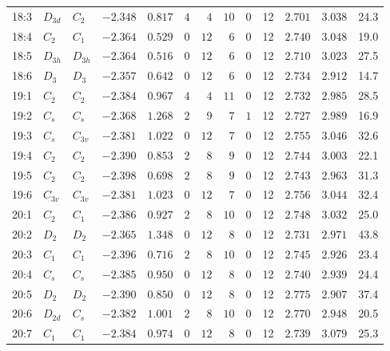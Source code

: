\begin{table}[ht!]
\begin{tabular}{lllrrrrrrrrrr}
18:3    & $D_{3d}$ & $C_{2 }$  & $-2.348$ & $0.817$  & $4$ & $4$  & $10$ & $0$ & 12 & $2.701$ & $3.038$  &  24.3 \\
18:4    & $C_2$    & $C_{1 }$  & $-2.364$ & $0.529$  & $0$ & $12$ & $6$  & $0$ & 12 & $2.740$ & $3.048$  &  19.0 \\
18:5    & $D_{3h}$ & $D_{3h}$  & $-2.364$ & $0.516$  & $0$ & $12$ & $6$  & $0$ & 12 & $2.710$ & $3.023$  &  27.5 \\
18:6    & $D_3$    & $D_{3 }$  & $-2.357$ & $0.642$  & $0$ & $12$ & $6$  & $0$ & 12 & $2.734$ & $2.912$  &  14.7 \\
19:1    & $C_2$    & $C_{2 }$  & $-2.384$ & $0.967$  & $4$ & $4$  & $11$ & $0$ & 12 & $2.732$ & $2.985$  &  28.5 \\
19:2    & $C_s$    & $C_{s }$  & $-2.368$ & $1.268$  & $2$ & $9$  & $7$  & $1$ & 12 & $2.727$ & $2.989$  &  16.9 \\
19:3    & $C_s$    & $C_{3v}$  & $-2.381$ & $1.022$  & $0$ & $12$ & $7$  & $0$ & 12 & $2.755$ & $3.046$  &  32.6 \\
19:4    & $C_2$    & $C_{2 }$  & $-2.390$ & $0.853$  & $2$ & $8$  & $9$  & $0$ & 12 & $2.744$ & $3.003$  &  22.1 \\
19:5    & $C_2$    & $C_{2 }$  & $-2.398$ & $0.698$  & $2$ & $8$  & $9$  & $0$ & 12 & $2.743$ & $2.963$  &  31.3 \\
19:6    & $C_{3v}$ & $C_{3v}$  & $-2.381$ & $1.023$  & $0$ & $12$ & $7$  & $0$ & 12 & $2.756$ & $3.044$  &  32.4 \\
20:1    & $C_2$    & $C_{1 }$  & $-2.386$ & $0.927$  & $2$ & $8$  & $10$ & $0$ & 12 & $2.748$ & $3.032$  &  25.0 \\
20:2    & $D_2$    & $D_{2 }$  & $-2.365$ & $1.348$  & $0$ & $12$ & $8$  & $0$ & 12 & $2.731$ & $2.971$  &  43.8 \\
20:3    & $C_1$    & $C_{1 }$  & $-2.396$ & $0.716$  & $2$ & $8$  & $10$ & $0$ & 12 & $2.745$ & $2.926$  &  23.4 \\
20:4    & $C_s$    & $C_{s }$  & $-2.385$ & $0.950$  & $0$ & $12$ & $8$  & $0$ & 12 & $2.740$ & $2.939$  &  24.4 \\
20:5    & $D_2$    & $D_{2 }$  & $-2.390$ & $0.850$  & $0$ & $12$ & $8$  & $0$ & 12 & $2.775$ & $2.907$  &  37.4 \\
20:6    & $D_{2d}$ & $C_{s }$  & $-2.382$ & $1.001$  & $2$ & $8$  & $10$ & $0$ & 12 & $2.770$ & $2.948$  &  20.5 \\
20:7    & $C_1$    & $C_{1 }$  & $-2.384$ & $0.974$  & $0$ & $12$ & $8$  & $0$ & 12 & $2.739$ & $3.079$  &  25.3 \\

\end{tabular}
\end{table}
